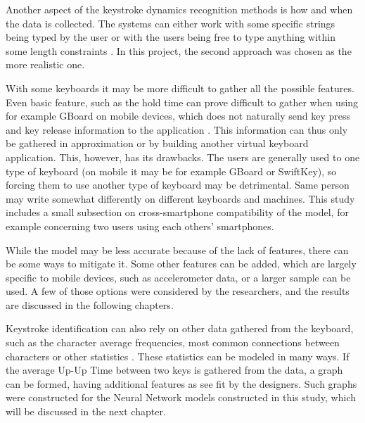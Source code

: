 Another aspect of the keystroke dynamics recognition methods is how and when the data is collected. The systems can either work with some specific strings being typed by the user \cite{ceker_cnn2017} or with the users being free to type anything within some length constraints \cite{Lu2020}. In this project, the second approach was chosen as the more realistic one.

With some keyboards it may be more difficult to gather all the possible features. Even basic feature, such as the hold time can prove difficult to gather when using for example GBoard on mobile devices, which does not naturally send key press and key release information to the application \cite{android_keyboard_commands_2025}. This information can thus only be gathered in approximation or by building another virtual keyboard application. This, however, has its drawbacks. The users are generally used to one type of keyboard (on mobile it may be for example GBoard or SwiftKey), so forcing them to use another type of keyboard may be detrimental. Same person may write somewhat differently on different keyboards and machines. This study includes a small subsection on cross-smartphone compatibility of the model, for example concerning two users using each others' smartphones.

While the model may be less accurate because of the lack of features, there can be some ways to mitigate it. Some other features can be added, which are largely specific to mobile devices, such as accelerometer data, or a larger sample can be used. A few of those options were considered by the researchers, and the results are discussed in the following chapters.

Keystroke identification can also rely on other data gathered from the keyboard, such as the character average frequencies, most common connections between characters or other statistics \cite{Wang2024}. These statistics can be modeled in many ways. If the average Up-Up Time between two keys is gathered from the data, a graph can be formed, having additional features as see fit by the designers. Such graphs were constructed for the Neural Network models constructed in this study, which will be discussed in the next chapter.